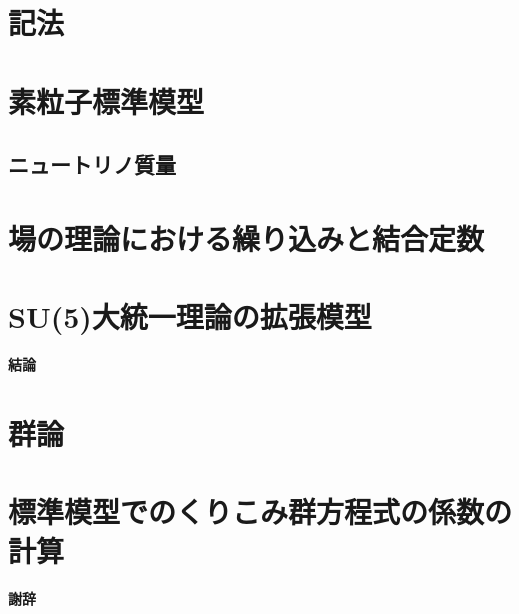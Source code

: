\documentclass[uplatex,dvipdfmx,a4paper,titlepage,10pt]{jsreport}
\theoremstyle{plain}
\theoremstyle{definition}
\begin{document}
\chapter{記法}


\chapter{素粒子標準模型}



\section{ニュートリノ質量}


\chapter{場の理論における繰り込みと結合定数}





\chapter{SU(5)大統一理論の拡張模型}


\newpage
\noindent
{\large \bf{結論}}



\appendix
\chapter{群論}


\chapter{標準模型でのくりこみ群方程式の係数の計算}


\newpage
\noindent
{\large \bf{謝辞}}




\end{document}

